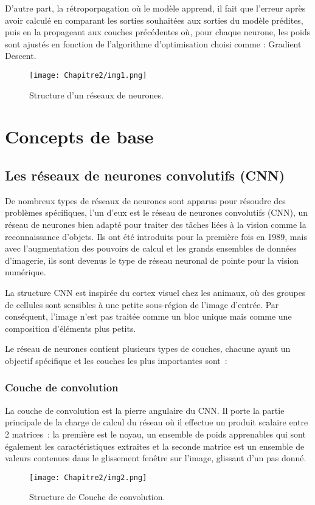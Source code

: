 D'autre part, la rétroporpagation où le modèle apprend, il fait que l'erreur après avoir calculé en comparant les sorties souhaitées aux sorties du modèle prédites, puis en la propageant aux couches précédentes où, pour chaque neurone, les poids sont ajustés en fonction de l'algorithme d'optimisation choisi comme : Gradient Descent.
\begin{figure}[H]
     \centering
     \texttt{[image: Chapitre2/img1.png]}
     \caption{Structure d'un réseaux de neurones.}
     \label{img1}
     \end{figure}

\section{Concepts de base} 
     \subsection{Les réseaux de neurones convolutifs (CNN)} 
     De nombreux types de réseaux de neurones sont apparus pour résoudre des problèmes spécifiques, l'un d'eux est le réseau de neurones convolutifs (CNN), un réseau de neurones bien adapté pour traiter des tâches liées à la vision comme la reconnaissance d'objets. Ils ont été introduits pour la première fois en 1989, mais avec l'augmentation des pouvoirs de calcul et les grands ensembles de données d'imagerie, ils sont devenus le type de réseau neuronal de pointe pour la vision numérique.
     
     La structure CNN est inspirée du cortex visuel chez les animaux, où des groupes de cellules sont sensibles à une petite sous-région de l'image d'entrée. Par conséquent, l'image n'est pas traitée comme un bloc unique mais comme une composition d'éléments plus petits. \cite{db3}
     
     Le réseau de neurones contient plusieurs types de couches, chacune ayant un objectif spécifique et les couches les plus importantes sont :
     
     \subsubsection{Couche de convolution}   
     La couche de convolution est la pierre angulaire du CNN. Il porte la partie principale de la charge de calcul du réseau où il effectue un produit scalaire entre 2 matrices : la première est le noyau, un ensemble de poids apprenables qui sont également les caractéristiques extraites et la seconde matrice est un ensemble de valeurs contenues dans le glissement fenêtre sur l'image, glissant d'un pas donné.
     \begin{figure}[H]
          \centering
          \texttt{[image: Chapitre2/img2.png]}
          \caption{Structure de Couche de convolution. \cite{db4}}
          \label{img2}
          \end{figure}
     
